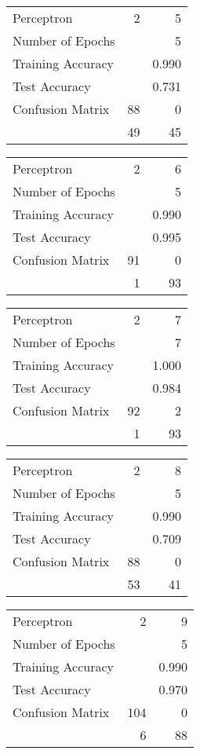 \documentclass[11pt]{article}
\begin{document}
\begin{minipage}[t]{0.5\textwidth}
\begin{tabular}{|l | r r|}
\hline Perceptron & 2 & 5\\
Number of Epochs & & 5\\
Training Accuracy & & 0.990\\
Test Accuracy & & 0.731\\
Confusion Matrix & 88 & 0\\
 &49 & 45\\ \hline
\end{tabular}
\end{minipage}
\begin{minipage}[t]{0.5\textwidth}
\begin{tabular}{|l | r r|}
\hline Perceptron & 2 & 6\\
Number of Epochs & & 5\\
Training Accuracy & & 0.990\\
Test Accuracy & & 0.995\\
Confusion Matrix & 91 & 0\\
 &1 & 93\\ \hline
\end{tabular}
\end{minipage}
\begin{minipage}[t]{0.5\textwidth}
\begin{tabular}{|l | r r|}
\hline Perceptron & 2 & 7\\
Number of Epochs & & 7\\
Training Accuracy & & 1.000\\
Test Accuracy & & 0.984\\
Confusion Matrix & 92 & 2\\
 &1 & 93\\ \hline
\end{tabular}
\end{minipage}
\begin{minipage}[t]{0.5\textwidth}
\begin{tabular}{|l | r r|}
\hline Perceptron & 2 & 8\\
Number of Epochs & & 5\\
Training Accuracy & & 0.990\\
Test Accuracy & & 0.709\\
Confusion Matrix & 88 & 0\\
 &53 & 41\\ \hline
\end{tabular}
\end{minipage}
\begin{minipage}[t]{0.5\textwidth}
\begin{tabular}{|l | r r|}
\hline Perceptron & 2 & 9\\
Number of Epochs & & 5\\
Training Accuracy & & 0.990\\
Test Accuracy & & 0.970\\
Confusion Matrix & 104 & 0\\
 &6 & 88\\ \hline
\end{tabular}
\end{minipage}
\end{document}
